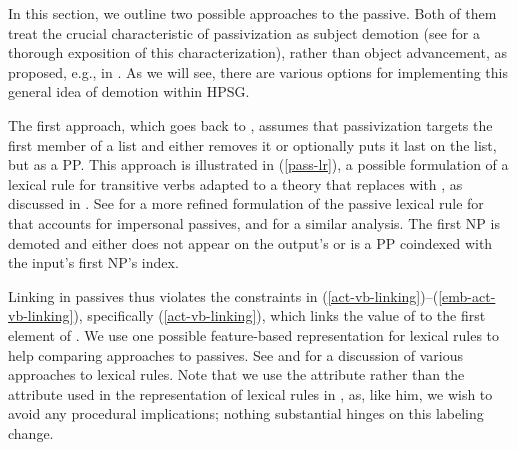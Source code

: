 \documentclass[output=paper
 	        ,biblatex
                ,babelshorthands
                ,newtxmath
                ,draftmode
                ,colorlinks, citecolor=brown
]{langscibook}
\begin{document}
In this section, we outline two possible approaches to 
the passive.  
Both of them treat the crucial characteristic of passivization as subject demotion (see \citealt{Blevins2003} for a thorough exposition of this characterization), rather than object advancement, as proposed, e.g., in  \citep{PerlmutterandPostal1983b}.
As we will see, there are various options for implementing this general idea of demotion within HPSG.

The first approach, which goes back to \citet[]{pollard+sag:1987}, assumes that passivization targets the first member of a  list and either removes it or optionally puts it last on the list, but as a PP.
This approach is illustrated in (\ref{pass-lr}), a possible formulation of a lexical rule for transitive verbs adapted to a theory that replaces  with \argst, as discussed in \citet[67]{Manning+Sag:1999}. 
See  for a  more refined formulation of the passive lexical rule for  that accounts for impersonal passives, and \citet{Blevins2003} for a similar analysis.
The first NP is demoted and either does not appear on the output's \argst or is a PP coindexed with the input's first NP's index. 

Linking in passives thus violates the constraints in (\ref{act-vb-linking})--(\ref{emb-act-vb-linking}), specifically (\ref{act-vb-linking}), which links the value of  to the first element of \argst. We use one possible feature-based representation for lexical rules to help comparing approaches to passives. See \citet{Meurers2001} and  for a discussion of various approaches to lexical rules.
Note that we use the attribute  rather than the  attribute used in the
representation of lexical rules in \citet[76]{Meurers2001}, as, like him, we wish to avoid any procedural implications; nothing substantial hinges on this labeling change.
\end{document}
